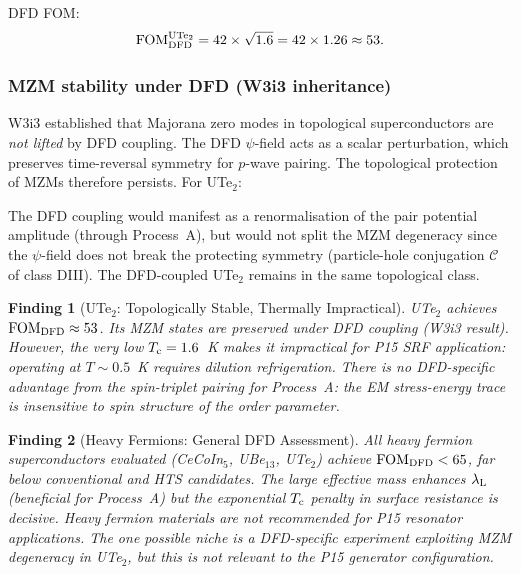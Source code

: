 \documentclass[11pt]{article}
\newtheorem{finding}{Finding}
\newcommand{\lambdaL}{\lambda_{\rm L}}
\newcommand{\Tc}{T_{\rm c}}
\newcommand{\FOM}{\mathrm{FOM}}
\begin{document}
DFD FOM:
\begin{equation}
\FOM_{\rm DFD}^{\rm UTe_2}
= 42 \times \sqrt{1.6}
= 42 \times 1.26
\approx 53.
\label{eq:fom-ute2}
\end{equation}

\subsubsection{MZM stability under DFD (W3i3 inheritance)}

W3i3 established that Majorana zero modes in topological superconductors are
\emph{not lifted} by DFD coupling. The DFD $\psi$-field acts as a scalar
perturbation, which preserves time-reversal symmetry for $p$-wave pairing.
The topological protection of MZMs therefore persists. For UTe$_2$:

The DFD coupling would manifest as a renormalisation of the pair potential
amplitude (through Process~A), but would not split the MZM degeneracy since
the $\psi$-field does not break the protecting symmetry (particle-hole
conjugation $\mathcal{C}$ of class DIII). The DFD-coupled UTe$_2$ remains in
the same topological class.

\begin{finding}[UTe$_2$: Topologically Stable, Thermally Impractical]
\label{finding:ute2}
UTe$_2$ achieves $\FOM_{\rm DFD} \approx 53$. Its MZM states are preserved
under DFD coupling (W3i3 result). However, the very low $\Tc = 1.6$~K makes
it impractical for P15 SRF application: operating at $T \sim 0.5$~K requires
dilution refrigeration. There is no DFD-specific advantage from the
spin-triplet pairing for Process~A: the EM stress-energy trace is insensitive
to spin structure of the order parameter.
\end{finding}

\begin{finding}[Heavy Fermions: General DFD Assessment]
\label{finding:hf-general}
All heavy fermion superconductors evaluated (CeCoIn$_5$, UBe$_{13}$, UTe$_2$)
achieve $\FOM_{\rm DFD} < 65$, far below conventional and HTS candidates.
The large effective mass enhances $\lambdaL$ (beneficial for Process~A) but
the exponential $\Tc$ penalty in surface resistance is decisive. Heavy fermion
materials are \emph{not recommended} for P15 resonator applications.
The one possible niche is a DFD-specific experiment exploiting MZM degeneracy
in UTe$_2$, but this is not relevant to the P15 generator configuration.
\end{finding}
\end{document}

